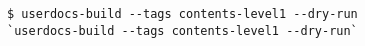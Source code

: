 \begin{verbatim}
$ userdocs-build --tags contents-level1 --dry-run
`userdocs-build --tags contents-level1 --dry-run`
\end{verbatim}
